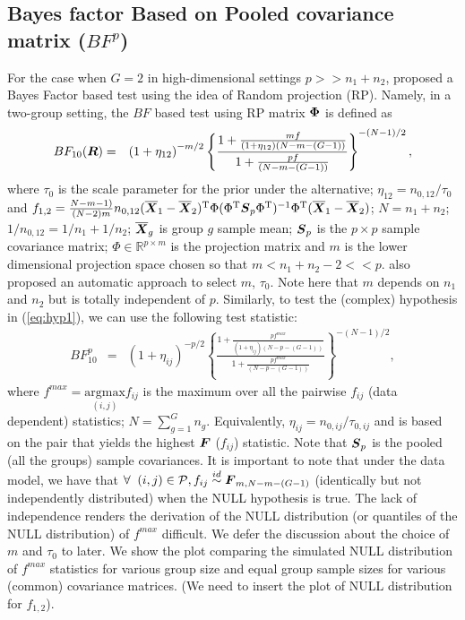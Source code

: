 \documentclass[12pt]{article}
\def\be{\begin{eqnarray}}
\def\ee{\end{eqnarray}}
\def\trans{^{\rm T}}
\newcommand{\uF}       {\mbox{\boldmath$F$}}
\newcommand{\uR}       {\mbox{\boldmath$R$}}
\newcommand{\uS}       {\mbox{\boldmath$S$}}
\newcommand{\uX}       {\mbox{\boldmath$X$}}
\newcommand{\uPhi}              {\mbox{\boldmath$\Phi$}}
\begin{document}
\subsection{Bayes factor Based on Pooled covariance matrix ($BF^{p}$)} \label{sec:testpl}
For the case when $G = 2$ in high-dimensional settings $p >> n_1+n_2$, \cite{zoh2018powerful} proposed a Bayes Factor  based test using the idea of Random projection (RP). Namely, in a two-group setting, the $BF$ based test using RP matrix $\uPhi$ is defined as
\be
BF_{10}(\uR) &=& \left(1 + \eta_{12} \right)^{-m/2} \left\{\frac{  1 + \frac{mf}{(1 + \eta_{12})(N-m-(G-1))}}{ 1 + \frac{p f}{(N-m-(G-1))}  } \right\}^{-(N-1)/2}, \label{eq:BF1}
\ee
where $\tau_0$ is the scale parameter for the prior under the alternative; $\eta_{12} = n_{0,12}/\tau_{0}$ and $f_{1,2}  = \frac{N-m-1)}{(N-2)m} n_{0,12} (\overline{\uX}_1 - \overline{\uX}_2)\trans\Phi(\Phi\trans\uS_{p}\Phi\trans)^{-1}\Phi\trans(\overline{\uX}_1 - \overline{\uX}_2)$; $N = n_1 + n_2$;
 $ 1/n_{0,12} = 1/n_1 + 1/n_2$; $\overline{\uX}_g$ is group $g$ sample mean; $\uS_p$ is the $p \times p$ sample covariance matrix; $\Phi \in \mathbb{R}^{p \times m}$ is the projection matrix and $m$ is the lower dimensional projection space chosen so that $m < n_1 +n_2 - 2 << p$. \cite{zoh2018powerful} also proposed an automatic approach to select $m$, $\tau_0$. Note here that $m$ depends on $n_1$ and $n_2$ but is totally independent of $p$.
 Similarly,  to test the (complex) hypothesis in (\ref{eq:hyp1}), we can use the following test statistic:
\be
BF^{p}_{10} &=& \left(1 + \eta_{ij} \right)^{-p/2} \left\{ \frac{  1 + \frac{pf^{max}}{(1 + \eta_{ij})(N-p-(G-1))}}{ 1 + \frac{p f^{max}}{(N-p-(G-1))}  } \right\}^{-(N-1)/2}, \label{eq:BFmax}
\ee
where $f^{max} = \underset{(i,j)}{\mathrm{argmax}}  f_{ij}$ is the maximum over all the pairwise $f_{ij}$ (data dependent) statistics; $N = \sum^{G}_{g=1}n_g$. Equivalently, $\eta_{ij} = n_{0, ij}/\tau_{0,ij}$ and is based on the pair that yields the highest $\uF$ ($f_{ij}$) statistic. Note that $\uS_p$ is the pooled (all the groups) sample covariances. It is important to note that under the data model, we have that $\forall\;\;(i,j) \in \mathcal{P},  f_{ij} \stackrel{id}{\sim} \uF_{m, N - m- (G-1)}$ (identically but not independently distributed) when the NULL hypothesis is true. The lack of independence renders the derivation of the NULL distribution (or quantiles of the NULL distribution) of $f^{max}$ difficult. We defer the discussion about the choice of $m$ and $\tau_0$ to later. We show the plot comparing the simulated NULL distribution of $f^{max}$ statistics for various group size and equal group sample sizes for various (common) covariance matrices. (We need to insert the plot of NULL distribution for $f_{1,2}$).
\end{document}
